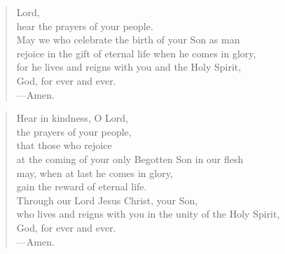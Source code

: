 \prayer

\setlength{\vleftmargin}{\prayerleftmargini}

\begin{verse}
Lord,\\
hear the prayers of your people.\\
May we who celebrate the birth of your Son as man\\
rejoice in the gift of eternal life when he comes in glory,\\
for he lives and reigns with you and the Holy Spirit,\\
God, for ever and ever.\\
{\color{red}---\thinspace}Amen.
\end{verse}


\begin{verse}
Hear in kindness, O Lord,\\
the prayers of your people,\\
that those who rejoice\\
at the coming of your only Begotten Son in our flesh\\
may, when at last he comes in glory,\\
gain the reward of eternal life.\\
Through our Lord Jesus Christ, your Son,\\
who lives and reigns with you in the unity of the Holy Spirit,\\
God, for ever and ever.\\
{\color{red}---\thinspace}Amen.

\end{verse}

\setlength{\vleftmargin}{\defleftmargini}